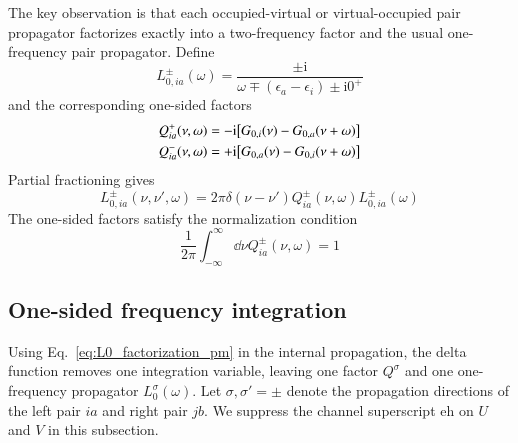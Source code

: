 \documentclass[aip,jcp,reprint,noshowkeys,superscriptaddress]{revtex4-1}
\newcommand{\eps}{\epsilon}
\newcommand{\ii}{\mathrm{i}}
\newcommand{\eh}{\text{eh}}
\begin{document}
The key observation is that each occupied-virtual or
virtual-occupied pair propagator factorizes exactly into a two-frequency
factor and the usual one-frequency pair propagator.
Define
\begin{equation}
    L_{0,ia}^{\pm}(\omega)
    =\frac{\pm\ii}{\omega\mp(\eps_a-\eps_i)\pm\ii0^+}
    \label{eq:L0_pm}
\end{equation}
and the corresponding one-sided factors
\begin{equation}
	\begin{aligned}
	Q^+_{ia}(\nu,\omega)
	&=
	-\ii
	\qty[
	G_{0,i}(\nu) - G_{0,a}(\nu+\omega)
	]
	\\
	Q^-_{ia}(\nu,\omega)
	&=
	+\ii
	\qty[
	G_{0,a}(\nu) - G_{0,i}(\nu+\omega)
	]
	\end{aligned}
	\label{eq:Q_pm}
\end{equation}
Partial fractioning gives
\begin{equation}
    L_{0,ia}^{\pm}(\nu,\nu',\omega)
    =2\pi\delta(\nu-\nu')Q^{\pm}_{ia}(\nu,\omega)
    L_{0,ia}^{\pm}(\omega)
    \label{eq:L0_factorization_pm}
\end{equation}
The one-sided factors satisfy the normalization condition
\begin{equation}
    \frac{1}{2\pi}\int_{-\infty}^{\infty}\dd{\nu}
    Q^{\pm}_{ia}(\nu,\omega)=1
    \label{eq:Q_normalization}
\end{equation}

\subsection{One-sided frequency integration}

Using Eq.~\eqref{eq:L0_factorization_pm} in the internal propagation,
the delta function removes one integration variable, leaving one factor
$Q^\sigma$ and one one-frequency propagator $L_0^\sigma(\omega)$.
Let $\sigma,\sigma'=\pm$ denote the propagation directions of the left
pair $ia$ and right pair $jb$. We suppress the channel superscript $\eh$
on $U$ and $V$ in this subsection.
\end{document}
